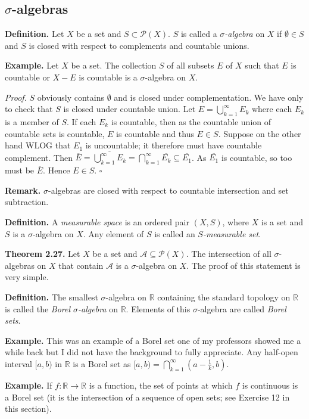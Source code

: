 \documentclass[a4paper]{article}
\newcommand{\R}{\mathbb{R}}
\begin{document}
\subsection{$\sigma$-algebras}

\textbf{Definition.} Let $X$ be a set and $S \subset \mathcal{P}(X)$. $S$ is called a \emph{$\sigma$-algebra} on $X$ if $\emptyset \in S$ and $S$ is closed with respect to complements and countable unions.

\textbf{Example.} Let $X$ be a set. The collection $S$ of all subsets $E$ of $X$ such that $E$ is countable or $X - E$ is countable is a $\sigma$-algebra on $X$.

\emph{Proof.} $S$ obviously contains $\emptyset$ and is closed under complementation. We have only to check that $S$ is closed under countable union. Let $E = \bigcup_{k=1}^\infty E_k$ where each $E_k$ is a member of $S$. If each $E_k$ is countable, then as the countable union of countable sets is countable, $E$ is countable and thus $E \in S$. Suppose on the other hand WLOG that $E_1$ is uncountable; it therefore must have countable complement. Then $\overline{E} = \overline{\bigcup_{k=1}^\infty E_k} = \bigcap_{k=1}^\infty \overline{E_k} \subseteq \overline{E_1}$. As $\overline{E_1}$ is countable, so too must be $\overline{E}$. Hence $E \in S$. $\square$

\textbf{Remark.} $\sigma$-algebras are closed with respect to countable intersection and set subtraction.

\textbf{Definition.} A \emph{measurable space} is an ordered pair $(X, S)$, where $X$ is a set and $S$ is a $\sigma$-algebra on $X$. Any element of $S$ is called an \emph{$S$-measurable set}.

\textbf{Theorem 2.27.} Let $X$ be a set and $\mathcal{A} \subseteq \mathcal{P}(X)$. The intersection of all $\sigma$-algebras on $X$ that contain $\mathcal{A}$ is a $\sigma$-algebra on $X$. The proof of this statement is very simple.

\textbf{Definition.} The smallest $\sigma$-algebra on $\R$ containing the standard topology on $\R$ is called the \emph{Borel $\sigma$-algebra} on $\R$. Elements of this $\sigma$-algebra are called \emph{Borel sets}.

\textbf{Example.} This was an example of a Borel set one of my professors showed me a while back but I did not have the background to fully appreciate. Any half-open interval $[a, b)$ in $\R$ is a Borel set as $[a, b) = \bigcap_{k=1}^\infty \left(a - \frac1k, b\right)$.

\textbf{Example.} If $f : \R \to \R$ is a function, the set of points at which $f$ is continuous is a Borel set (it is the intersection of a sequence of open sets; see Exercise 12 in this section).
\end{document}
